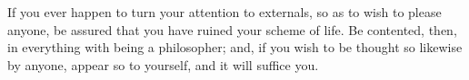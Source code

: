 If you ever happen to turn your attention to externals, so as
to wish to please anyone, be assured that you have ruined your scheme
of life. Be contented, then, in everything with being a philosopher;
and, if you wish to be thought so likewise by anyone, appear so to
yourself, and it will suffice you. 
